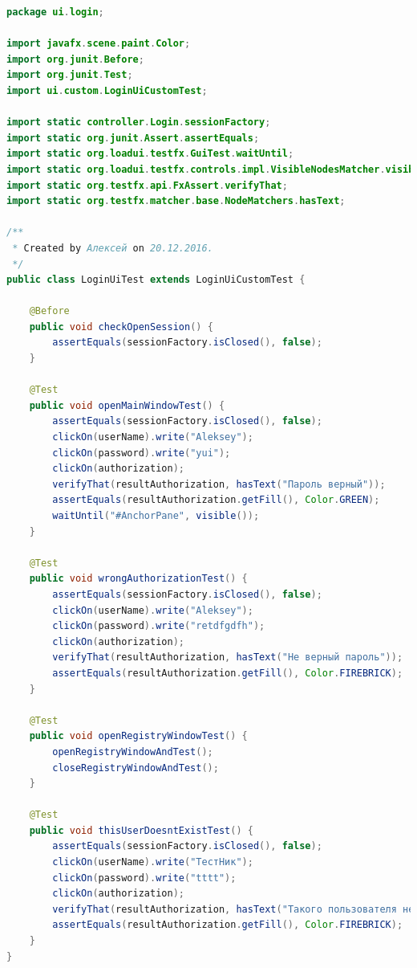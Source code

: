 \documentclass[a4paper,12pt]{article}
\begin{document}
\newpage
\begin{lstlisting}[language=java, caption=код модуля LoginUiTest.java]
package ui.login;

import javafx.scene.paint.Color;
import org.junit.Before;
import org.junit.Test;
import ui.custom.LoginUiCustomTest;

import static controller.Login.sessionFactory;
import static org.junit.Assert.assertEquals;
import static org.loadui.testfx.GuiTest.waitUntil;
import static org.loadui.testfx.controls.impl.VisibleNodesMatcher.visible;
import static org.testfx.api.FxAssert.verifyThat;
import static org.testfx.matcher.base.NodeMatchers.hasText;

/**
 * Created by Алексей on 20.12.2016.
 */
public class LoginUiTest extends LoginUiCustomTest {

    @Before
    public void checkOpenSession() {
        assertEquals(sessionFactory.isClosed(), false);
    }

    @Test
    public void openMainWindowTest() {
        assertEquals(sessionFactory.isClosed(), false);
        clickOn(userName).write("Aleksey");
        clickOn(password).write("yui");
        clickOn(authorization);
        verifyThat(resultAuthorization, hasText("Пароль верный"));
        assertEquals(resultAuthorization.getFill(), Color.GREEN);
        waitUntil("#AnchorPane", visible());
    }

    @Test
    public void wrongAuthorizationTest() {
        assertEquals(sessionFactory.isClosed(), false);
        clickOn(userName).write("Aleksey");
        clickOn(password).write("retdfgdfh");
        clickOn(authorization);
        verifyThat(resultAuthorization, hasText("Не верный пароль"));
        assertEquals(resultAuthorization.getFill(), Color.FIREBRICK);
    }

    @Test
    public void openRegistryWindowTest() {
        openRegistryWindowAndTest();
        closeRegistryWindowAndTest();
    }

    @Test
    public void thisUserDoesntExistTest() {
        assertEquals(sessionFactory.isClosed(), false);
        clickOn(userName).write("ТестНик");
        clickOn(password).write("tttt");
        clickOn(authorization);
        verifyThat(resultAuthorization, hasText("Такого пользователя не существует"));
        assertEquals(resultAuthorization.getFill(), Color.FIREBRICK);
    }
}
\end{lstlisting}
\end{document}
